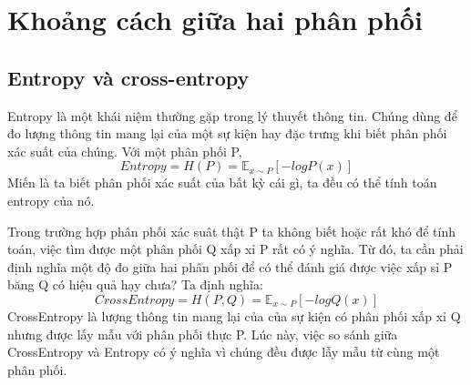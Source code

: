 \section{Khoảng cách giữa hai phân phối}
\subsection{Entropy và cross-entropy}
Entropy là một khái niệm thường gặp trong lý thuyết thông tin. Chúng dùng để đo lượng thông tin mang lại của một sự kiện hay đặc trưng khi biết phân phối xác suất của chúng.
Với một phân phối P,
\begin{equation*}
Entropy = H(P) = \mathbb{E}_{x\sim P}[-logP(x)]
\end{equation*}
Miến là ta biết phân phối xác suất của bất kỳ cái gì, ta đều có thể tính toán entropy của nó.

Trong trường hợp phân phối xác suât thật P ta không biết hoặc rất khó để tính toán, việc tìm được một phân phối Q xấp xỉ P rất có ý nghĩa. Từ đó, ta cần phải định nghĩa một độ đo giữa hai phân phối để có thể đánh giá được việc xấp sỉ P băng Q có hiệu quả hạy chưa?
Ta định nghĩa:
\begin{equation*}
CrossEntropy = H(P,Q) = \mathbb{E}_{x\sim P}[-logQ(x)]
\end{equation*}
CrossEntropy là lượng thông tin mang lại của của sự kiện có phân phối xấp xỉ Q nhưng được lấy mẫu với phân phối thực P.
Lúc này, việc so sánh giữa CrossEntropy và Entropy có ý nghĩa vì chúng đều được lẫy mẫu từ cùng một phân phối.
